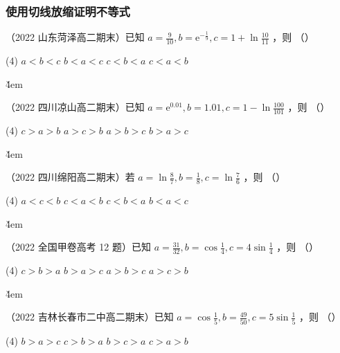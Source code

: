 \subsubsection{使用切线放缩证明不等式}

\begin{example}
    （2022 山东菏泽高二期末）已知 $a=\frac{9}{10}, b=\mathrm{e}^{-\frac{1}{9}}, c=1+\ln \frac{10}{11}$ ，则 （\quad）
    \begin{tasks}(4)
        \task $a<b<c$
        \task $b<a<c$
        \task $c<b<a$
        \task $c<a<b$
    \end{tasks}
\end{example}

\v{4em}

\begin{example}
    （2022 四川凉山高二期末）已知 $a=\mathrm{e}^{0.01}, b=1.01, c=1-\ln \frac{100}{101}$ ，则 （\quad）
    \begin{tasks}(4)
        \task $c>a>b$
        \task $a>c>b$
        \task $a>b>c$
        \task $b>a>c$
    \end{tasks}
\end{example}

\v{4em}

\begin{example}
    （2022 四川绵阳高二期末）若 $a=\ln \frac{8}{7}, b=\frac{1}{8}, c=\ln \frac{7}{6}$ ，则 （\quad）
    \begin{tasks}(4)
        \task $a<c<b$
        \task $c<a<b$
        \task $c<b<a$
        \task $b<a<c$
    \end{tasks}
\end{example}

\v{4em}

\begin{example}
    （2022 全国甲卷高考 12 题）已知 $a=\frac{31}{32}, b=\cos \frac{1}{4}, c=4 \sin \frac{1}{4}$ ，则 （\quad）
    \begin{tasks}(4)
        \task $c>b>a$
        \task $b>a>c$
        \task $a>b>c$
        \task $a>c>b$
    \end{tasks}
\end{example}

\v{4em}

\begin{example}
    （2022 吉林长春市二中高二期末）已知 $a=\cos \frac{1}{5}, b=\frac{49}{50}, c=5 \sin \frac{1}{5}$ ，则 （\quad）
    \begin{tasks}(4)
        \task $b>a>c$
        \task $c>b>a$
        \task $b>c>a$
        \task $c>a>b$
    \end{tasks}
\end{example}



